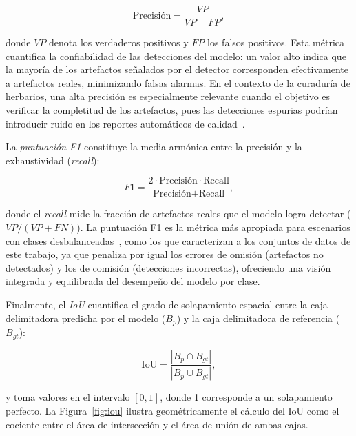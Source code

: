 \begin{equation}
  \text{Precisión} = \frac{VP}{VP + FP},
  \label{eq:precision}
\end{equation}
 
\noindent donde $VP$ denota los verdaderos positivos y $FP$ los falsos positivos.
Esta métrica cuantifica la confiabilidad de las detecciones del modelo: un valor alto
indica que la mayoría de los artefactos señalados por el detector corresponden
efectivamente a artefactos reales, minimizando falsas alarmas. En el contexto de la
curaduría de herbarios, una alta precisión es especialmente relevante cuando el objetivo
es verificar la completitud de los artefactos, pues las detecciones espurias podrían
introducir ruido en los reportes automáticos de calidad~\cite{powers2020evaluation}.
 
La \textit{puntuación F1} constituye la media armónica entre la precisión y la
exhaustividad (\textit{recall}):
 
\begin{equation}
  F1 = \frac{2 \cdot \text{Precisión} \cdot \text{Recall}}
            {\text{Precisión} + \text{Recall}},
  \label{eq:f1}
\end{equation}
 
\noindent donde el \textit{recall} mide la fracción de artefactos reales que el modelo
logra detectar ($VP / (VP + FN)$). La puntuación F1 es la métrica más apropiada para
escenarios con clases desbalanceadas~\cite{powers2020evaluation}, como los que caracterizan
a los conjuntos de datos de este trabajo, ya que penaliza por igual los errores de omisión
(artefactos no detectados) y los de comisión (detecciones incorrectas), ofreciendo una
visión integrada y equilibrada del desempeño del modelo por clase.
 
Finalmente, el \textit{IoU} cuantifica el grado de solapamiento espacial entre la caja
delimitadora predicha por el modelo ($B_p$) y la caja delimitadora de referencia ($B_{gt}$):
 
\begin{equation}
  \text{IoU} = \frac{|B_p \cap B_{gt}|}{|B_p \cup B_{gt}|},
  \label{eq:iou}
\end{equation}

\noindent y toma valores en el intervalo $[0, 1]$, donde 1 corresponde a un solapamiento
perfecto. La Figura~\ref{fig:iou} ilustra geométricamente el cálculo del IoU como el
cociente entre el área de intersección y el área de unión de ambas cajas.


